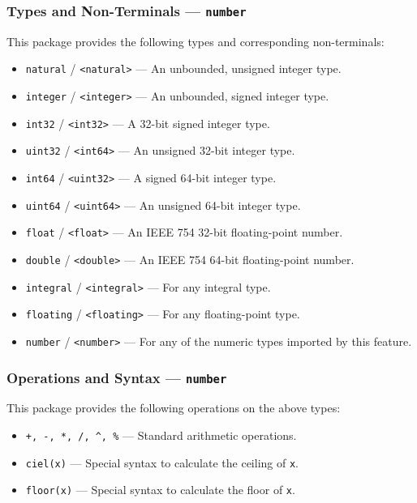 \subsubsection{Types and Non-Terminals --- \texttt{number}} %
\label{ssub:types_number}
This package provides the following types and corresponding non-terminals:
\begin{itemize}
    \item \texttt{natural} / \texttt{<natural>} --- An unbounded, unsigned integer type.
    \item \texttt{integer} / \texttt{<integer>} --- An unbounded, signed integer type.
    \item \texttt{int32} / \texttt{<int32>} --- A 32-bit signed integer type.
    \item \texttt{uint32} / \texttt{<int64>} --- An unsigned 32-bit integer type.
    \item \texttt{int64} / \texttt{<uint32>} --- A signed 64-bit integer type.
    \item \texttt{uint64} / \texttt{<uint64>} --- An unsigned 64-bit integer type.
    \item \texttt{float} / \texttt{<float>} --- An IEEE 754 32-bit floating-point number.
    \item \texttt{double} / \texttt{<double>} --- An IEEE 754 64-bit floating-point number.
    \item \texttt{integral} / \texttt{<integral>} --- For any integral type.
    \item \texttt{floating} / \texttt{<floating>} --- For any floating-point type.
    \item \texttt{number} / \texttt{<number>} --- For any of the numeric types imported by this feature.
\end{itemize}


\subsubsection{Operations and Syntax --- \texttt{number}} %
\label{ssub:operations_and_syntax_number}
This package provides the following operations on the above types:
\begin{itemize}
    \item \texttt{+, -, *, /, ^, \%} --- Standard arithmetic operations.
    \item \texttt{ciel(x)} --- Special syntax to calculate the ceiling of \texttt{x}.
    \item \texttt{floor(x)} --- Special syntax to calculate the floor of \texttt{x}.
\end{itemize}


